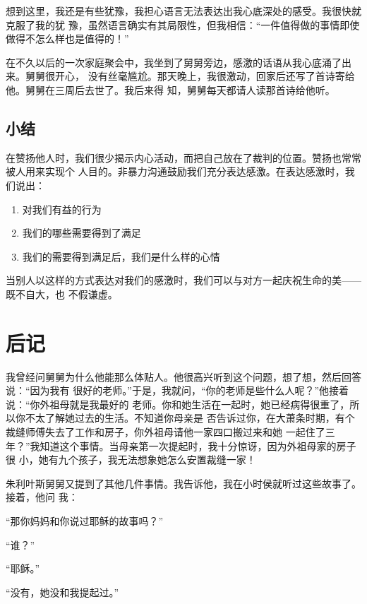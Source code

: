 \documentclass{ctexart}
\renewenvironment{quotation}{\setlength{\parskip}{0.5em}\setstretch{1.5}\kaishu\zihao{-5}\setlength{\parindent}{1em}}{\vspace{1em}}
\begin{document}
想到这里，我还是有些犹豫，我担心语言无法表达出我心底深处的感受。我很快就克服了我的犹
豫，虽然语言确实有其局限性，但我相信：``一件值得做的事情即使做得不怎么样也是值得的！''

在不久以后的一次家庭聚会中，我坐到了舅舅旁边，感激的话语从我心底涌了出来。舅舅很开心，
没有丝毫尴尬。那天晚上，我很激动，回家后还写了首诗寄给他。舅舅在三周后去世了。我后来得
知，舅舅每天都请人读那首诗给他听。


\subsection{小结}

在赞扬他人时，我们很少揭示内心活动，而把自己放在了裁判的位置。赞扬也常常被人用来实现个
人目的。非暴力沟通鼓励我们充分表达感激。在表达感激时，我们说出：

\begin{enumerate}[label=（\arabic*）]
	\item 对我们有益的行为
	\item 我们的哪些需要得到了满足
	\item 我们的需要得到满足后，我们是什么样的心情
\end{enumerate}

当别人以这样的方式表达对我们的感激时，我们可以与对方一起庆祝生命的美------既不自大，也
不假谦虚。

\section{后记}\label{sec:后记}

我曾经问舅舅为什么他能那么体贴人。他很高兴听到这个问题，想了想，然后回答说：``因为我有
很好的老师。''于是，我就问，``你的老师是些什么人呢？''他接着说：``你外祖母就是我最好的
老师。你和她生活在一起时，她已经病得很重了，所以你不太了解她过去的生活。不知道你母亲是
否告诉过你，在大萧条时期，有个裁缝师傅失去了工作和房子，你外祖母请他一家四口搬过来和她
一起住了三年？''我知道这个事情。当母亲第一次提起时，我十分惊讶，因为外祖母家的房子很
小，她有九个孩子，我无法想象她怎么安置裁缝一家！

朱利叶斯舅舅又提到了其他几件事情。我告诉他，我在小时侯就听过这些故事了。接着，他问
我：

\begin{quotation}
	``那你妈妈和你说过耶稣的故事吗？''

	``谁？''

	``耶稣。''

	``没有，她没和我提起过。''
\end{quotation}
\end{document}
